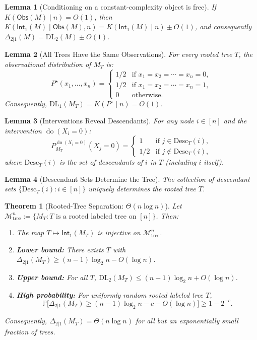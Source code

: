 \documentclass[10pt,a4paper]{amsart}
\newtheorem{lemma}{Lemma}
\newtheorem{theorem}{Theorem}
\newcommand{\DL}{\mathrm{DL}}
\newcommand{\Desc}{\mathrm{Desc}}
\newcommand{\Int}{\mathsf{Int}}
\newcommand{\Obs}{\mathsf{Obs}}
\newcommand{\Prob}{\mathbb{P}}
\newcommand{\calM}{\mathcal{M}}
\DeclareMathOperator{\doop}{do}
\begin{document}
\begin{lemma}[Conditioning on a constant-complexity object is free]
\label{lem:conditioning-simple}
If $K(\Obs(M) \mid n) = O(1)$, then $K(\Int_1(M) \mid \Obs(M), n) = K(\Int_1(M) \mid n) \pm O(1)$, and consequently $\Delta_{2|1}(M) = \DL_2(M) \pm O(1)$.
\end{lemma}

\begin{lemma}[All Trees Have the Same Observations]
\label{lem:tree-obs}
For every rooted tree $T$, the observational distribution of $M_T$ is:
\[
P^\star(x_1, \ldots, x_n) = \begin{cases}
1/2 & \text{if } x_1 = x_2 = \cdots = x_n = 0, \\
1/2 & \text{if } x_1 = x_2 = \cdots = x_n = 1, \\
0 & \text{otherwise}.
\end{cases}
\]
Consequently, $\DL_1(M_T) = K(P^\star \mid n) = O(1)$.
\end{lemma}

\begin{lemma}[Interventions Reveal Descendants]
\label{lem:tree-intervention}
For any node $i \in [n]$ and the intervention $\doop(X_i = 0)$:
\[
P_{M_T}^{\doop(X_i = 0)}(X_j = 0) = \begin{cases}
1 & \text{if } j \in \Desc_T(i), \\
1/2 & \text{if } j \notin \Desc_T(i),
\end{cases}
\]
where $\Desc_T(i)$ is the set of descendants of $i$ in $T$ (including $i$ itself).
\end{lemma}

\begin{lemma}[Descendant Sets Determine the Tree]
\label{lem:descendants-determine-tree}
The collection of descendant sets $\{\Desc_T(i) : i \in [n]\}$ uniquely determines the rooted tree $T$.
\end{lemma}

\begin{theorem}[Rooted-Tree Separation: $\Theta(n \log n)$]
\label{thm:tree-separation}
Let $\calM_{\mathrm{tree}}^n := \{M_T : T \text{ is a rooted labeled tree on } [n]\}$. Then:
\begin{enumerate}
    \item The map $T \mapsto \Int_1(M_T)$ is injective on $\calM_{\mathrm{tree}}^n$.
    \item \textbf{Lower bound:} There exists $T$ with $\Delta_{2|1}(M_T) \geq (n-1)\log_2 n - O(\log n)$.
    \item \textbf{Upper bound:} For all $T$, $\DL_2(M_T) \leq (n-1)\log_2 n + O(\log n)$.
    \item \textbf{High probability:} For uniformly random rooted labeled tree $T$,
    \[
    \Prob\bigl[\Delta_{2|1}(M_T) \geq (n-1)\log_2 n - c - O(\log n)\bigr] \geq 1 - 2^{-c}.
    \]
\end{enumerate}
Consequently, $\Delta_{2|1}(M_T) = \Theta(n \log n)$ for all but an exponentially small fraction of trees.
\end{theorem}
\end{document}
